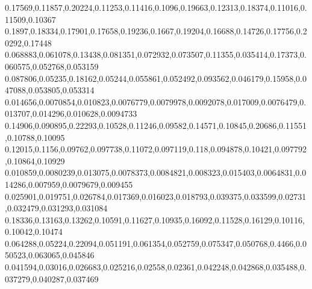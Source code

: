 0.17569,0.11857,0.20224,0.11253,0.11416,0.1096,0.19663,0.12313,0.18374,0.11016,0.11509,0.10367
0.1897,0.18334,0.17901,0.17658,0.19236,0.1667,0.19204,0.16688,0.14726,0.17756,0.20292,0.17448
0.068883,0.061078,0.13438,0.081351,0.072932,0.073507,0.11355,0.035414,0.17373,0.060575,0.052768,0.053159
0.087806,0.05235,0.18162,0.05244,0.055861,0.052492,0.093562,0.046179,0.15958,0.047088,0.053805,0.053314
0.014656,0.0070854,0.010823,0.0076779,0.0079978,0.0092078,0.017009,0.0076479,0.013707,0.014296,0.010628,0.0094733
0.14906,0.090895,0.22293,0.10528,0.11246,0.09582,0.14571,0.10845,0.20686,0.11551,0.10788,0.10095
0.12015,0.1156,0.09762,0.097738,0.11072,0.097119,0.118,0.094878,0.10421,0.097792,0.10864,0.10929
0.010859,0.0080239,0.013075,0.0078373,0.0084821,0.008323,0.015403,0.0064831,0.014286,0.007959,0.0079679,0.009455
0.025901,0.019751,0.026784,0.017369,0.016023,0.018793,0.039375,0.033599,0.02731,0.032479,0.031293,0.031084
0.18336,0.13163,0.13262,0.10591,0.11627,0.10935,0.16092,0.11528,0.16129,0.10116,0.10042,0.10474
0.064288,0.05224,0.22094,0.051191,0.061354,0.052759,0.075347,0.050768,0.4466,0.050523,0.063065,0.045846
0.041594,0.03016,0.026683,0.025216,0.02558,0.02361,0.042248,0.042868,0.035488,0.037279,0.040287,0.037469
